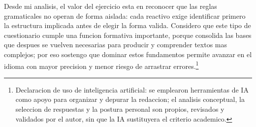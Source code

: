 \documentclass[
	spanish,
	letterpaper, oneside
]{article}
\begin{document}
Desde mi analisis, el valor del ejercicio esta en reconocer que las reglas gramaticales no operan de forma aislada: cada reactivo exige identificar primero la estructura implicada antes de elegir la forma valida. Considero que este tipo de cuestionario cumple una funcion formativa importante, porque consolida las bases que despues se vuelven necesarias para producir y comprender textos mas complejos; por eso sostengo que dominar estos fundamentos permite avanzar en el idioma con mayor precision y menor riesgo de arrastrar errores.\footnote{Declaracion de uso de inteligencia artificial: se emplearon herramientas de IA como apoyo para organizar y depurar la redaccion; el analisis conceptual, la seleccion de respuestas y la postura personal son propios, revisados y validados por el autor, sin que la IA sustituyera el criterio academico.}


\clearpage


\end{document}
